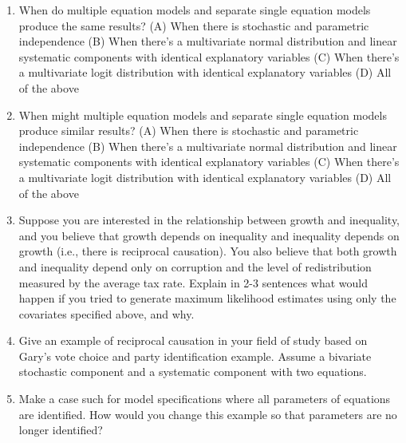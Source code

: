 \documentclass[11pt]{article}
\begin{document}
\begin{enumerate}
\item When do multiple equation models and separate single equation models produce the same results? (A) When there is stochastic and parametric independence (B) When there's a multivariate normal distribution and linear systematic components with identical explanatory variables (C) When there's a multivariate logit distribution with identical explanatory variables (D) All of the above %
\item When might multiple equation models and separate single equation models produce similar results? (A) When there is stochastic and parametric independence (B) When there's a multivariate normal distribution and linear systematic components with identical explanatory variables (C) When there's a multivariate logit distribution with identical explanatory variables (D) All of the above
\item Suppose you are interested in the relationship between growth and inequality, and you believe that growth depends on inequality and inequality depends on growth (i.e., there is reciprocal causation). You also believe that both growth and inequality depend only on corruption and the level of redistribution measured by the average tax rate. Explain in 2-3 sentences what would happen if you tried to generate maximum likelihood estimates using only the covariates specified above, and why.  %
\item Give an example of reciprocal causation in your field of study based on Gary's vote choice and party identification example. Assume a bivariate stochastic component and a systematic component with two equations.
\item Make a case such for model specifications where all parameters of equations are identified. How would you change this example so that parameters are no longer identified? 
\end{enumerate}
\end{document}
